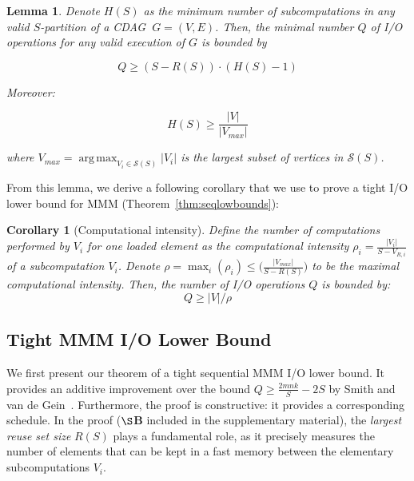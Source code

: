 \documentclass[sigplan,review,anonymous,10pt]{acmart}\settopmatter{printfolios=true,printccs=false,printacmref=false}
\newtheorem*{corollary*}{Corollary}
\DeclareMathOperator*{\argmax}{arg\,max}
\newtheorem{lma}{Lemma}
\begin{document}
\begin{lma}
	\label{lma:reuse}
	Denote $H(S)$ as the minimum number of subcomputations in any valid 
	$S$-partition of a CDAG $\ G=(V,E)$. Then,
	the minimal number $Q$ of I/O operations for any valid execution of $G$ 
	 is bounded by  
	
	\vspace{-1em}
	\begin{equation}
	Q \ge (S - R(S)) \cdot (H(S) - 1)
	\label{eq:reusebound} \end{equation}
	\vspace{-1em}
	
	\noindent
	Moreover: 
	
	\vspace{-1.5em}
	\begin{equation}\label{eq:reusebound-pmax}
	H(S) \ge \frac{|V|}{|V_{max}|}
	\end{equation}
	\vspace{-0.5em}
	
	\noindent
	where $V_{max} = \argmax_{V_i \in \mathcal{S}(S)}|V_i|$ is 
	the largest
	subset of vertices in $\mathcal{S}(S)$.
\end{lma}
 
From this lemma, we derive a following corollary that we use to prove a tight 
I/O lower bound for MMM (Theorem~\ref{thm:seqlowbounds}):

\begin{corollary*}[Computational intensity]
	\label{cor:q}
	Define the number of computations performed by $V_i$ for one loaded 
	element as the \emph{computational 
		intensity} $\rho_i = \frac{|V_i|}{S - V_{R,i}}$ of a subcomputation 
		$V_i$.
	Denote $\rho = \max_i(\rho_i) \le \Big(\frac{|V_{max}|}{S-R(S)}\Big)$ to be 
	the \emph{maximal computational intensity}.
	Then, the number of I/O operations $Q$ is bounded by:
	\begin{equation}
	Q \ge {|V|}/{\rho}
	\end{equation} 
\end{corollary*}

\subsection{Tight MMM I/O Lower Bound} 
\label{sec:seqOpt}
We first present our theorem of a tight sequential
MMM I/O lower bound. It provides an additive improvement over the bound $Q \ge 
\frac{2mnk}{S} - 2S$ by Smith and van de 
Gein~\cite{tightMMM}. Furthermore, the proof is constructive: it provides a 
corresponding schedule. In the proof ($\S$\textbf{B} included in the 
supplementary material), the \emph{largest reuse set size} $R(S)$ plays a 
fundamental 
role, as it precisely measures the number of elements that can be kept in a 
fast memory between the elementary subcomputations $V_i$.
\end{document}
